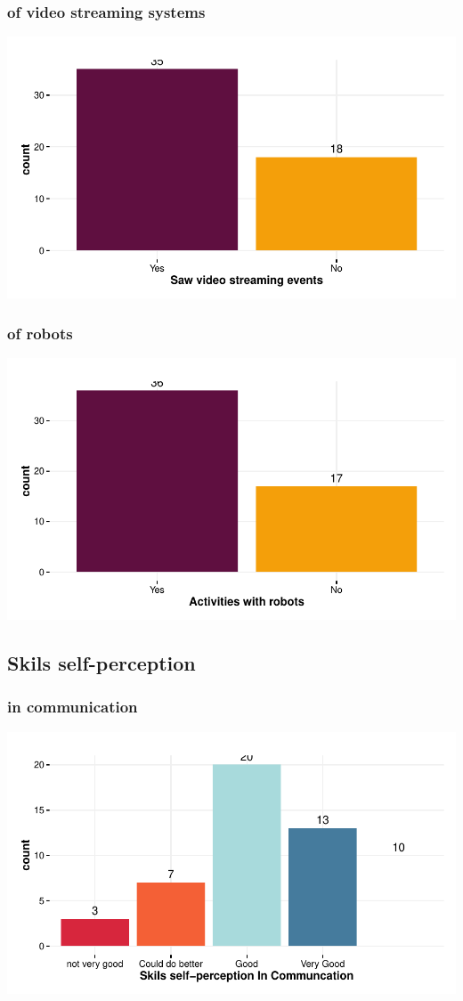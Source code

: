 \documentclass{article}
\begin{document}
\subsubsection{of video streaming systems}
\includegraphics{Raw_num/plots/-plot_video_stream}

\subsubsection{of robots}
\includegraphics{Raw_num/plots/-plot_past_robot}

\subsection{Skils self-perception}
\subsubsection{in communication}
\includegraphics{Raw_num/plots/-plot_skill_selfp_com}
\end{document}
